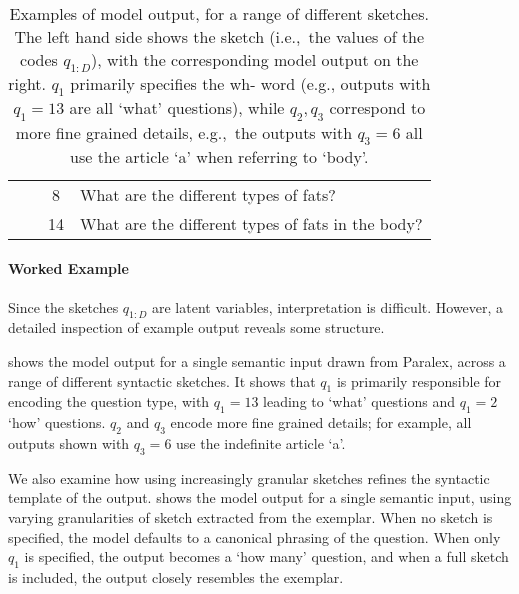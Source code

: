 \documentclass[11pt]{article}
\begin{document}
\begin{table}[t]
\begin{tabular}{@{~}c@{~}c@{~}c@{~}|@{~}p{6cm}@{}}
 &  & 8  &  What are the different types of fats?  \\

&  & 14  &  What are the different types of fats in the body?  \\




\hline \hline
    \end{tabular}
\caption{Examples of model output, for a range of different sketches. The left hand side shows the sketch (i.e.,~the values of the codes $q_{1:D}$), with the corresponding model output on the right. $q_1$ primarily specifies the wh- word (e.g., outputs with $q_1=13$ are all `what' questions), while $q_2,q_3$ correspond to more fine grained details, e.g.,~the outputs with $q_3=6$ all use the article `a' when referring to `body'.}
\label{tab:workedex}
\end{table}


\paragraph{Worked Example}

Since the sketches $q_{1:D}$ are latent variables, interpretation is difficult. However, a detailed inspection of example output reveals some structure.

 shows the model output for a single semantic input drawn from Paralex, across a range of different syntactic sketches. It shows that $q_1$ is primarily responsible for encoding the question type, with $q_1=13$ leading to `what' questions and $q_1=2$ `how' questions. $q_2$ and $q_3$ encode more fine grained details; for example, all outputs shown with $q_3=6$ use the indefinite article `a'.

We also examine how using increasingly granular sketches refines the syntactic template of the output.  shows the model output for a single semantic input, using varying granularities of sketch extracted from the exemplar. When no sketch is specified, the model defaults to a canonical phrasing of the question. When only $q_1$ is specified, the output becomes a `how many' question, and when a full sketch is included, the output closely resembles the exemplar.
\end{document}

